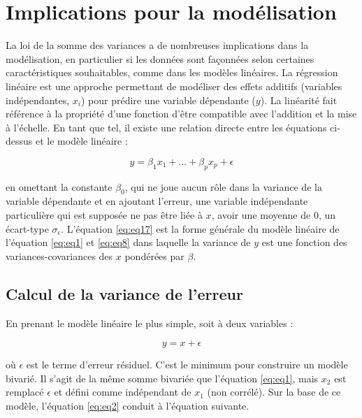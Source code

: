 \documentclass[
]{book}
\begin{document}
\hypertarget{implications-pour-la-moduxe9lisation}{%
\section{Implications pour la modélisation}\label{implications-pour-la-moduxe9lisation}}

La loi de la somme des variances a de nombreuses implications dans la modélisation, en particulier si les données sont façonnées selon certaines caractéristiques souhaitables, comme dans les modèles linéaires. La régression linéaire est une approche permettant de modéliser des effets additifs (variables indépendantes, \(x_i\)) pour prédire une variable dépendante (\(y\)). La linéarité fait référence à la propriété d'une fonction d'être compatible avec l'addition et la mise à l'échelle. En tant que tel, il existe une relation directe entre les équations ci-dessus et le modèle linéaire :

\begin{equation}
y=\beta_1 x_1 + ... +\beta_p x_p+\epsilon
\label{eq:eq17}
\end{equation}

en omettant la constante \(\beta_0\), qui ne joue aucun rôle dans la variance de la variable dépendante et en ajoutant l'erreur, une variable indépendante particulière qui est supposée ne pas être liée à \(x\), avoir une moyenne de \(0\), un écart-type \(\sigma_\epsilon\). L'équation \eqref{eq:eq17} est la forme générale du modèle linéaire de l'équation \eqref{eq:eq1} et \eqref{eq:eq8} dans laquelle la variance de \(y\) est une fonction des variances-covariances des \(x\) pondérées par \(\beta\).

\hypertarget{calcul-de-la-variance-de-lerreur}{%
\subsection{Calcul de la variance de l'erreur}\label{calcul-de-la-variance-de-lerreur}}

En prenant le modèle linéaire le plus simple, soit à deux variables :

\begin{equation}
y=x+\epsilon
\label{eq:eq18}
\end{equation}

où \(\epsilon\) est le terme d'erreur résiduel. C'est le minimum pour construire un modèle bivarié. Il s'agit de la même somme bivariée que l'équation \eqref{eq:eq1}, mais \(x_2\) est remplacé \(\epsilon\) et défini comme indépendant de \(x_1\) (non corrélé). Sur la base de ce modèle, l'équation \eqref{eq:eq2} conduit à l'équation suivante.
\end{document}
